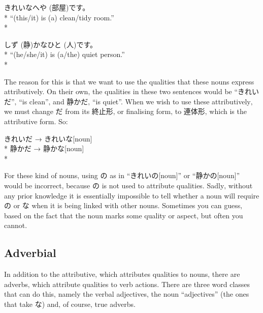 \documentclass[11pt, b5paper, twoside, openright, onecolumn]{book}
\makeatletter
\newcommand*{\rubystack}[2]{{\relscale{0.5}%
  \begin{tabular}[b]{@{}c@{}}%
    {#1}\\%
   {\textscale{2}{#2}}%
  \end{tabular}}%
}
\DeclareRobustCommand*{\ruby}[2]{%
  \mbox{%
    \setlength{\parskip}{0ex}%
    \BeginAccSupp{method=pdfstringdef,ActualText={#1}}%
      \rubystack{\phantom{#2}}{#1}%
      \llap{%
        \rubystack{#2}{\phantom{#1}}%
      }%
    \EndAccSupp{}%
  }%
}
\renewcommand*{\ruby}[2]{#2 (#1)}%
\newenvironment{exampleblock}{
\setlength{\parindent}{0.6in}
\begin{minipage}[t]{\dimexpr\textwidth-\parindent}}
{\end{minipage}}
\makeatother
\begin{document}
\vspace{0.4cm}
\begin{exampleblock}
きれいな\ruby{部屋}{へや}です。 \\* 
“(this/it) is (a) clean/tidy room.” \\* 
\end{exampleblock}
\vspace{0.2cm}

\begin{exampleblock}
\ruby{静}{しず}かな\ruby{人}{ひと}です。 \\* 
“(he/she/it) is (a/the) quiet person.” \\* 
\end{exampleblock}
\vspace{0.2cm}

The reason for this is that we want to use the qualities that these nouns express attributively. On their own‚ the qualities in these two sentences would be “きれいだ”‚ “is clean”‚ and 静かだ‚ “is quiet”. When we wish to use these attributively‚ we must change だ from its 終止形‚ or finalising form‚ to 連体形‚ which is the attributive form. So:

\vspace{0.4cm}
\begin{exampleblock}
きれいだ → きれいな[noun] \\* 
静かだ → 静かな[noun] \\* 
\end{exampleblock}
\vspace{0.2cm}

For these kind of nouns‚ using の as in “きれいの[noun]” or “静かの[noun]” would be incorrect‚ because の is not used to attribute qualities. Sadly‚ without any prior knowledge it is essentially impossible to tell whether a noun will require の or な when it is being linked with other nouns. Sometimes you can guess‚ based on the fact that the noun marks some quality or aspect‚ but often you cannot.

\subsection{Adverbial}

In addition to the attributive‚ which attributes qualities to nouns‚ there are adverbs‚ which attribute qualities to verb actions. There are three word classes that can do this‚ namely the verbal adjectives‚ the noun “adjectives” (the ones that take な) and‚ of course‚ true adverbs.
\end{document}

